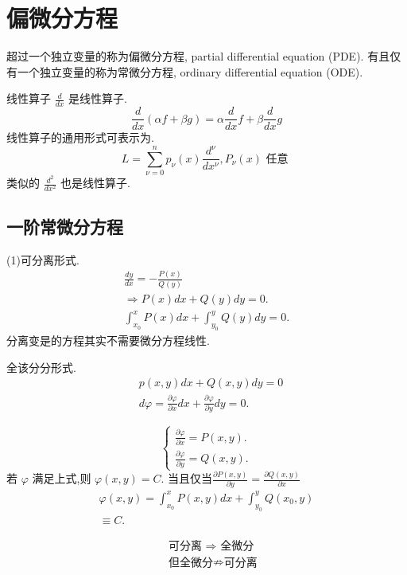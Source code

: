 \chapter{偏微分方程}
超过一个独立变量的称为偏微分方程, partial differential equation (PDE). 有且仅有一个独立变量的称为常微分方程, 
ordinary differential equation (ODE).

线性算子
$\frac{d}{d x}$ 是线性算子.
$$
\frac{d}{d x}(\alpha f+\beta g)=\alpha \frac{d}{d x} f +\beta \frac{d}{d x} g
$$
线性算子的通用形式可表示为.
$$
L=\sum_{\nu=0}^n p_\nu(x) \frac{d^\nu}{d x^\nu}, P_\nu(x) \text { 任意 }
$$
类似的 $\frac{d^2}{d x^2}$ 也是线性算子.
\section{一阶常微分方程}

(1)可分离形式.
$$
\begin{gathered}
\frac{d y}{d x}=-\frac{P(x)}{Q(y)} \\
\Rightarrow P(x) d x+Q(y) d y=0 . \\
\int_{x_0}^x P(x) d x+\int_{y_0}^y Q(y) d y=0 .
\end{gathered}
$$
分离变是的方程其实不需要微分方程线性.

全该分分形式.
$$
\begin{aligned}
& p(x, y) d x+Q(x, y) d y=0 \\
& d \varphi=\frac{\partial \varphi}{\partial x} d x+\frac{\partial \varphi}{\partial y} d y=0 .
\end{aligned}
$$

$$
\left\{\begin{array}{l}
\frac{\partial \varphi}{\partial x}=P(x, y) . \\
\frac{\partial \varphi}{\partial y}=Q(x, y) .
\end{array}\right.
$$
若 $\varphi$ 满足上式,则 $\varphi(x, y)=C$.
当且仅当$\frac{\partial P(x, y)}{\partial y} = \frac{\partial Q(x, y)}{\partial x}$
$$
\begin{gathered}
\varphi(x, y)=\int_{x_0}^x P(x, y) d x+\int_{y_0}^y Q(x_0, y) \\
\equiv C .
\end{gathered}
$$

$$
\begin{aligned}
    & \text { 可分离 } \Rightarrow \text { 全微分 } \\
    & \text { 但全微分} \nRightarrow \text{可分离} \\
\end{aligned}
$$

